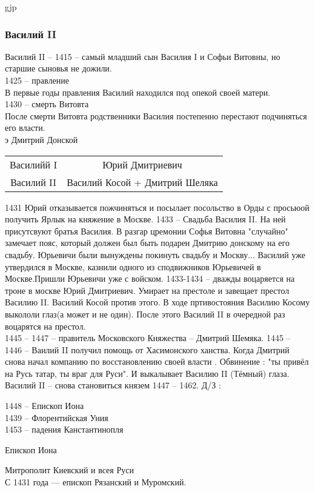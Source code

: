 gjp	 \documentclass[12pt,a4paper]{article}
\begin{document}
\subsubsection*{Василий II}
Василий II -- 1415 --  самый младший сын Василия I и Софьи Витовны, но старшие сыновья не дожили.\\
1425 -- правление\\
В первые годы правления Василий находился под опекой своей матери.\\
1430 -- смерть Витовта\\
 После смерти Витовта родственники Василия постепенно перестают подчиняться его власти. \\э
 Дмитрий Донской
\begin{tabular}{c||c}
Василийй I & Юрий Дмитриевич\\
Василий II & Василий Косой + Дмитрий Шеляка\\
\end{tabular}
1431 Юрий отказывается пожчиняться и посылает посольство в Орды с просьюой получить Ярлык на княжение в Москве.
1433 -- Свадьба Василия II. На ней присутсвуют братья Василия. В разгар цремонии Софья Витовна "случайно" замечает пояс,  который должен был быть подарен Дмитрию донскому на его свадьбу. Юрьевичи были вынуждены покинуть свадьбу и Москву... Василий уже утвердился в Москве, казнили одного из сподвижников Юрьевичей в Москве.Пришли Юрьевичи уже с войском.
1433-1434 -- дважды воцаряется на троне в москве Юрий Дмитриевич. Умирает на престоле и завещает престол Василию II. Василий Косой против этого. В ходе пртивостояния Василию Косому выкололи глаз(а может и не один). После этого Василий  II в очередной раз воцарятся на престол.\\
1445 -- 1447 -- правитель Московского Княжества -- Дмитрий Шемяка. 1445 -- 1446 -- Ваилий II получил помощь от Хасимонского ханства. Когда Дмитрий снова начал компанию по восстановлению своей власти . Обвинение : "ты привёл на Русь татар, ты враг для Руси". И выкалывает Василию II (Тёмный) глаза. Василий II -- снова становиться князем 1447 -- 1462.
Д/З :
\begin{Huge}
1448 -- Епископ Иона \\
1439 -- Флорентийская Уния \\
1453 -- падения Канстантинопля
\end{Huge}
\begin{center}
	Епископ Иона 
\end{center}
Митрополит Киевский и всея Руси\\
С 1431 года — епископ Рязанский и Муромский.\\
\end{document}
